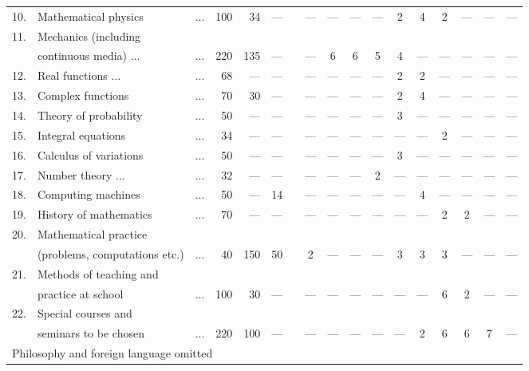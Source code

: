 \begin{landscape}
{\begin{longtable}{rlcrrcrcccccccccc}
10. & Mathematical physics & ... & 100 & 34 & --- && --- & --- & --- & --- & 2 & 4 & 2 & --- & --- & ---\\
11. & Mechanics (including &  &  &  & &&  & &  & &  &  & &  &  & \\[-4pt]
 & continuous media) ... & ... & 220 & 135 & --- && --- & 6 & 6 & 5 & 4 & --- & --- & --- & --- & ---\\
12. & Real functions ... & ... & 68 & --- & --- && --- & --- & --- & --- & 2 & 2 & --- & --- & --- & ---\\
13. & Complex functions & ... & 70 & 30 & --- && --- & --- & --- & --- & 2 & 4 & --- & --- & --- & ---\\
14. & Theory of probability & ... & 50 & --- & --- && --- & --- & --- & --- & 3 & --- & --- & --- & --- & ---\\
15. & Integral equations & ... & 34 & --- & --- && --- & --- & --- & --- & --- & --- & 2 & --- & --- & ---\\
16. & Calculus of variations & ... & 50 & --- & --- && --- & --- & --- & --- & 3 & --- & --- & --- & --- & ---\\
17. & Number theory ... & ... & 32 & --- & --- && --- & --- & --- & 2 & --- & --- & --- & --- & --- & ---\\
18. & Computing machines & ... & 50 & --- & 14 && --- & --- & --- & --- & --- & 4 & --- & --- & --- & ---\\
19. & History of mathematics & ... & 70 & --- & --- && --- & --- & --- & --- & --- & --- & 2 & 2 & --- & ---\\
20. & Mathematical practice & &  &  & &&  &  &  &  &  &  &  &  & &\\[-4pt]
 & (problems, computations etc.) & ... & 40 & 150 & 50 && 2 & --- & --- & --- & 3 & 3 & 3 & --- & --- & ---\\
21. & Methods of teaching and & &  &  & && & & & &  & &  & & &\\[-4pt]
 & practice at school & ... & 100 & 30 & --- && --- & --- & --- & --- & --- & --- & 6 & 2 & --- & ---\\
22. & Special courses and &  &  &  & && & &  &  &  &  &  &  & & \\[-4pt]
 & seminars to be chosen & ... & 220 & 100 & --- && --- & --- & --- & --- & --- & 2 & 6 & 6 & 7 & ---\\[7pt]
\multicolumn{10}{l}{Philosophy and foreign language omitted}\\
\end{longtable}
}\relax
\end{landscape}

